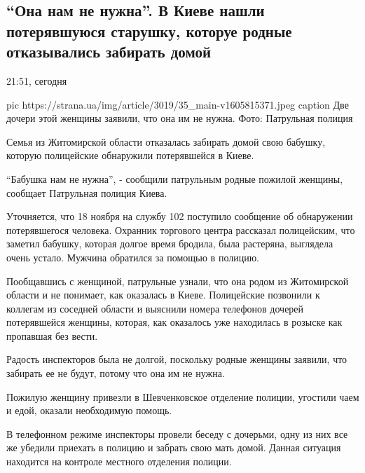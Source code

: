  
 
 

\subsection{\enquote{Она нам не нужна}. В Киеве нашли потерявшуюся старушку, которуе родные отказывались забирать домой}
\label{sec:19_11_2020.news.ua.strana.1.nenuzhnaja_babushka}

21:51, сегодня

\ifcmt
pic https://strana.ua/img/article/3019/35_main-v1605815371.jpeg
caption Две дочери этой женщины заявили, что она им не нужна. Фото: Патрульная полиция
\fi

Семья из Житомирской области отказалась забирать домой свою бабушку,
которую полицейские обнаружили потерявшейся в Киеве.

\enquote{Бабушка нам не нужна}, - сообщили патрульным родные пожилой женщины,
сообщает Патрульная полиция Киева.

Уточняется, что 18 ноября на службу 102 поступило сообщение об обнаружении
потерявшегося человека. Охранник торгового центра рассказал полицейским,
что заметил бабушку, которая долгое время бродила, была растеряна,
выглядела очень устало. Мужчина обратился за помощью в полицию.

Пообщавшись с женщиной, патрульные узнали, что она родом из Житомирской области
и не понимает, как оказалась в Киеве. Полицейские позвонили к коллегам из
соседней области и выяснили номера телефонов дочерей потерявшейся женщины,
которая, как оказалось уже находилась в розыске как пропавшая без вести.

Радость инспекторов была не долгой, поскольку родные женщины заявили, что
забирать ее не будут, потому что она им не нужна.

Пожилую женщину привезли в Шевченковское отделение полиции, угостили чаем и
едой, оказали необходимую помощь.

В телефонном режиме инспекторы провели беседу с дочерьми, одну из них все же
убедили приехать в полицию и забрать свою мать домой. Данная ситуация находится
на контроле местного отделения полиции.

